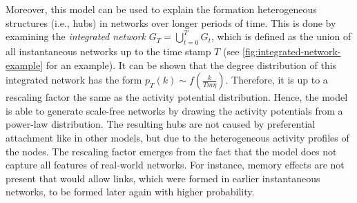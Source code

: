 Moreover, this model can be used to explain the formation heterogeneous structures (i.e., hubs) in networks over longer periods of time.
This is done by examining the \emph{integrated network} \(G_{T} = \bigcup_{t=0}^{T} G_{t}\), which is defined as the union of all instantaneous networks up to the time stamp \(T\) (see \cref{fig:integrated-network-example} for an example).
It can be shown that the  degree distribution of this integrated network has the form \(p_{T}(k) \sim f(\frac{k}{T m \eta})\).
Therefore, it is up to a rescaling factor the same as the activity potential distribution.
Hence, the model is able to generate scale-free networks by drawing the activity potentials from a power-law distribution.
The resulting hubs are not caused by preferential attachment like in other models, but due to the heterogeneous activity profiles of the nodes.
The rescaling factor emerges from the fact that the model does not capture all features of real-world networks.
For instance, memory effects are not present that would allow links, which were formed in earlier instantaneous networks, to be formed later again with higher probability.


